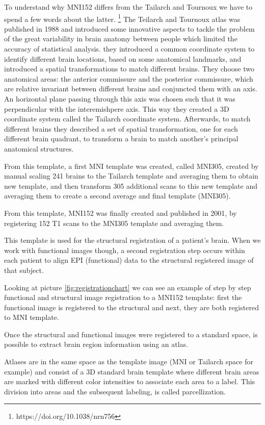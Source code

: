\documentclass[a4paper,11pt]{article}
\begin{document}
To understand why MNI152 differs from the Tailarch and Tournoux we have to spend a few words about the latter. \footnote{https://doi.org/10.1038/nrn756}
The Teilarch and Tournoux atlas was published in 1988 and introduced some innovative aspects to tackle the problem of the great variability in brain anatomy between people which limited the accuracy of statistical analysis.
they introduced a common coordinate system to identify different brain locations, based on some anatomical landmarks, and introduced a spatial transformations to match different brains.
They choose two anatomical areas: the anterior commissure and the posterior commissure, which are relative invariant between different brains and conjuncted them with an axis.
An horizontal plane passing through this axis was chosen such that it was perpendicular with the interemishpere axis.
This way they created a 3D coordinate system called the Tailarch coordinate system.
Afterwards, to match different brains they described a set of spatial transformation, one for each different brain quadrant, to transform a brain to match another's principal anatomical structures.

From this template, a first MNI template was created, called MNI305, created by manual scaling 241 brains to the Tailarch template and averaging them to obtain  new template, and then transform 305 additional scans to this new template and averaging them to create a second average and final template (MNI305).

From this template, MNI152 was finally created and published in 2001, by registering 152 T1 scans to the MNI305 template and averaging them.

This template is used for the structural registration of a patient's brain.
When we work with functional images though, a second registration step occurs within each patient to align EPI (functional) data to the structural registered image of that subject.

Looking at picture \ref{fig:registrationchart} we can see an example of step by step functional and structural image registration to a MNI152 template: first the functional image is registered to the structural and next, they are both registered to MNI template.

Once the structural and functional images were registered to a standard space, is possible to extract brain region information using an atlas.

Atlases are in the same space as the template image (MNI or Tailarch space for example) and consist of a 3D standard brain template where different brain areas are marked with different color intensities to associate each area to a label.
This division into areas and the subsequent labeling, is called parcellization.
\end{document}
